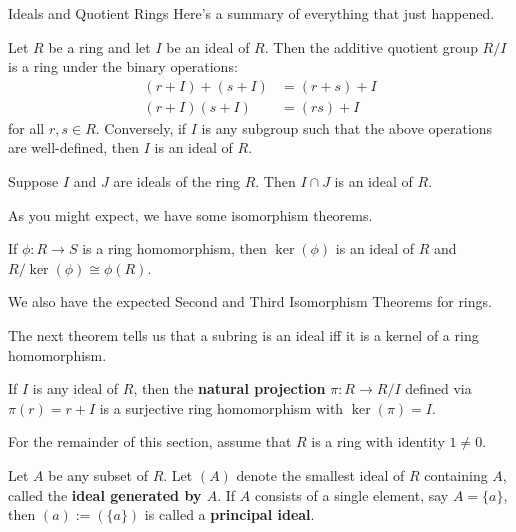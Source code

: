 \begin{section}{Ideals and Quotient Rings}
Here's a summary of everything that just happened.

\begin{theorem}
Let $R$ be a ring and let $I$ be an ideal of $R$.  Then the additive quotient group $R/I$ is a ring under the binary operations:
\begin{align}
(r+I)+(s+I) & =  (r+s)+I\\
(r+I)(s+I) & = (rs)+I
\end{align}
for all $r,s\in R$.  Conversely, if $I$ is any subgroup such that the above operations are well-defined, then $I$ is an ideal of $R$.
\end{theorem}

\begin{theorem}
Suppose $I$ and $J$ are ideals of the ring $R$.  Then $I\cap J$ is an ideal of $R$.
\end{theorem}

As you might expect, we have some isomorphism theorems.

\begin{theorem}
If $\phi:R\to S$ is a ring homomorphism, then $\ker(\phi)$ is an ideal of $R$ and $R/\ker(\phi)\cong \phi(R)$.
\end{theorem}


We also have the expected Second and Third Isomorphism Theorems for rings.  

The next theorem tells us that a subring is an ideal iff it is a kernel of a ring homomorphism.

\begin{theorem}
If $I$ is any ideal of $R$, then the \textbf{natural projection} $\pi:R\to R/I$ defined via $\pi(r)=r+I$ is a surjective ring homomorphism with $\ker(\pi)=I$.
\end{theorem}

For the remainder of this section, assume that $R$ is a ring with identity $1\neq 0$.

\begin{definition}
Let $A$ be any subset of $R$. Let $(A)$ denote the smallest ideal of $R$ containing $A$, called the \textbf{ideal generated by $A$}. If $A$ consists of a single element, say $A=\{a\}$, then $(a):=(\{a\})$ is called a \textbf{principal ideal}.
\end{definition}


\end{section}
